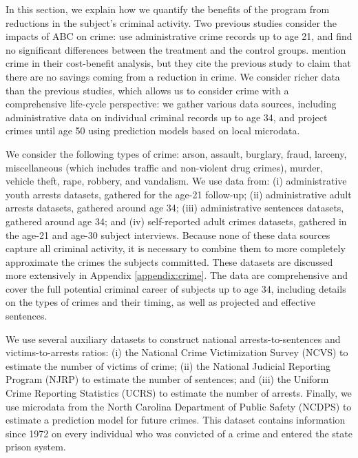 In this section, we explain how we quantify the benefits of the program from reductions in the subject's criminal activity. Two previous studies consider the impacts of ABC on crime: \citet{Clarke_Campbell_1998_ABC_Comparison_ECRQ} use administrative crime records up to age 21, and find no significant differences between the treatment and the control groups. \cite{Barnett_Masse_2007_EER} mention crime in their cost-benefit analysis, but they cite the previous study to claim that there are no savings coming from a reduction in crime. We consider richer data than the previous studies, which allows us to consider crime with a comprehensive life-cycle perspective: we gather various data sources, including administrative data on individual criminal records up to age 34, and project crimes until age 50 using prediction models based on local microdata.

We consider the following types of crime: arson, assault, burglary, fraud, larceny, miscellaneous (which includes traffic and non-violent drug crimes), murder, vehicle theft, rape, robbery, and vandalism. We use data from: (i) administrative youth arrests datasets, gathered for the age-21 follow-up; (ii) administrative adult arrests datasets, gathered around age 34; (iii) administrative sentences datasets, gathered around age 34; and (iv) self-reported adult crimes datasets, gathered in the age-21 and age-30 subject interviews. Because none of these data sources capture all criminal activity, it is necessary to combine them to more completely approximate the crimes the subjects committed. These datasets are discussed more extensively in Appendix \ref{appendix:crime}. The data are comprehensive and cover the full potential criminal career of subjects up to age 34, including details on the types of crimes and their timing, as well as projected and effective sentences.

We use several auxiliary datasets to construct national arrests-to-sentences and victims-to-arrests ratios: (i) the National Crime Victimization Survey (NCVS) to estimate the number of victims of crime; (ii) the National Judicial Reporting Program (NJRP) to estimate the number of sentences; and (iii) the Uniform Crime Reporting Statistics (UCRS) to estimate the number of arrests. Finally, we use microdata from the North Carolina Department of Public Safety (NCDPS) to estimate a prediction model for future crimes. This dataset contains information since 1972 on every individual who was convicted of a crime and entered the state prison system.

